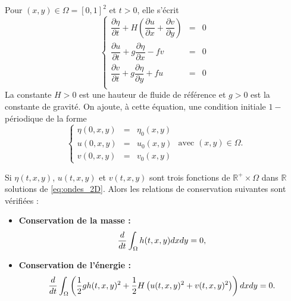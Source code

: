 Pour $(x,y) \in \Omega = [0,1]^2$ et $t>0$, elle s'écrit 
\begin{equation}
\left\lbrace
\begin{array}{rcl}
\dfrac{\partial \eta}{\partial t} + H \left( \dfrac{\partial u}{\partial x} + \dfrac{\partial v}{\partial y} \right) & = & 0 \\
\dfrac{\partial u}{\partial t} + g \dfrac{\partial \eta}{\partial x} - f v & = & 0 \\
\dfrac{\partial v}{\partial t} + g \dfrac{\partial \eta}{\partial y} + f u & = & 0 \\
\end{array}
\right.
\label{eq:ondes_2D}
\end{equation}
La constante $H>0$ est une hauteur de fluide de référence et $g>0$ est la constante de gravité.
On ajoute, à cette équation, une condition initiale $1-$périodique de la forme
\begin{equation}
\left\lbrace
\begin{array}{rcl}
\eta(0,x,y) & = & \eta_0(x,y)\\
u(0,x,y) & = & u_0(x,y)\\
v(0,x,y) & = & v_0(x,y)
\end{array}
\right. \text{ avec } (x,y) \in \Omega. 
\end{equation}


\begin{proposition}
Si $\eta(t,x,y)$, $u(t,x,y)$ et $v(t,x,y)$ sont trois fonctions de $\mathbb{R}^+ \times \Omega$ dans $\mathbb{R}$ solutions de \eqref{eq:ondes_2D}. Alors les relations de conservation suivantes sont vérifiées :
\begin{itemize}
\item \textbf{Conservation de la masse :}
\begin{equation}
\dfrac{d}{dt} \displaystyle\int_{\Omega} h(t,x,y)dxdy = 0,
\end{equation}
\item \textbf{Conservation de l'énergie :}
\begin{equation}
\dfrac{d}{dt} \displaystyle\int_{\Omega} \left( \dfrac{1}{2} g h(t,x,y)^2 + \dfrac{1}{2} H \left( u(t,x,y)^2 + v(t,x,y)^2 \right) \right) dxdy = 0.
\end{equation}
\end{itemize}
\end{proposition}

